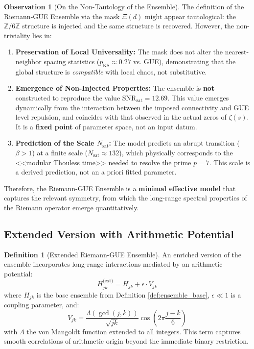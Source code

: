 \documentclass[12pt, a4paper]{article}
\theoremstyle{plain}
\theoremstyle{definition}
\newtheorem{definicion}[teorema]{Definition}
\newtheorem{observacion}[teorema]{Observation}
\theoremstyle{remark}
\begin{document}
\begin{observacion}[On the Non-Tautology of the Ensemble]
The definition of the Riemann-GUE Ensemble via the mask $\Xi(d)$ might appear tautological: the $\mathbb{Z}/6\mathbb{Z}$ structure is injected and the same structure is recovered. However, the non-triviality lies in:
\begin{enumerate}
    \item \textbf{Preservation of Local Universality:} The mask does not alter the nearest-neighbor spacing statistics ($p_{\text{KS}} \approx 0.27$ vs. GUE), demonstrating that the global structure is \textit{compatible} with local chaos, not substitutive.
    \item \textbf{Emergence of Non-Injected Properties:} The ensemble is \textbf{not} constructed to reproduce the value $\mathrm{SNR}_{\text{sat}} = 12.69$. This value emerges dynamically from the interaction between the imposed connectivity and GUE level repulsion, and coincides with that observed in the actual zeros of $\zeta(s)$. It is a \textbf{fixed point} of parameter space, not an input datum.
    \item \textbf{Prediction of the Scale $N_{\text{sat}}$:} The model predicts an abrupt transition ($\beta > 1$) at a finite scale ($N_{\text{sat}} \approx 132$), which physically corresponds to the <<modular Thouless time>> needed to resolve the prime $p=7$. This scale is a derived prediction, not an a priori fitted parameter.
\end{enumerate}
Therefore, the Riemann-GUE Ensemble is a \textbf{minimal effective model} that captures the relevant symmetry, from which the long-range spectral properties of the Riemann operator emerge quantitatively.
\end{observacion}

\subsection{Extended Version with Arithmetic Potential}
\label{subsec:version_extendida}

\begin{definicion}[Extended Riemann-GUE Ensemble]
An enriched version of the ensemble incorporates long-range interactions mediated by an arithmetic potential:
\[
H_{jk}^{\text{(ext)}} = H_{jk} + \epsilon \cdot V_{jk}
\]
where $H_{jk}$ is the base ensemble from Definition \ref{def:ensemble_base}, $\epsilon \ll 1$ is a coupling parameter, and:
\[
V_{jk} = \frac{\Lambda(\gcd(j,k))}{\sqrt{jk}} \cos\left(2\pi\frac{j-k}{6}\right)
\]
with $\Lambda$ the von Mangoldt function extended to all integers. This term captures smooth correlations of arithmetic origin beyond the immediate binary restriction.
\end{definicion}
\end{document}

